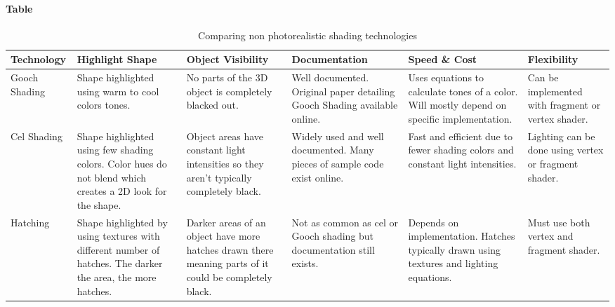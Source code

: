 \paragraph{Table}
\begin{center}
\begin{table}[H]
\begin{tabular}{ | m{7em} | m{7em} | m{7em} | m{7em} | m{7em} | m{7em} |  } 
\hline
\textbf{Technology}  & \textbf{Highlight Shape} & \textbf{Object Visibility} & \textbf{Documentation} & \textbf{Speed \& Cost} & \textbf{Flexibility} \\ \hline
Gooch Shading & Shape highlighted using warm to cool colors tones. & No parts of the 3D object is completely blacked out. & Well documented. Original paper detailing Gooch Shading available online. & Uses equations to calculate tones of a color. Will mostly depend on specific implementation. & Can be implemented with fragment or vertex shader.  \\ \hline
Cel Shading & Shape highlighted using few shading colors. Color hues do not blend which creates a 2D look for the shape. & Object areas have constant light intensities so they aren't typically completely black. & Widely used and well documented. Many pieces of sample code exist online. & Fast and efficient due to fewer shading colors and constant light intensities. & Lighting can be done using vertex or fragment shader.  \\ \hline
Hatching & Shape highlighted by using textures with different number of hatches. The darker the area, the more hatches. & Darker areas of an object have more hatches drawn there meaning parts of it could be completely black. & Not as common as cel or Gooch shading but documentation still exists. & Depends on implementation. Hatches typically drawn using textures and lighting equations. & Must use both vertex and fragment shader. \\ \hline
\end{tabular}
\newline
\caption{Comparing non photorealistic shading technologies}
\label{table:nonphoto}
\end{table}
\end{center}

\newpage


